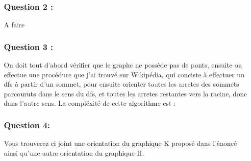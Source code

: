 \documentclass[]{article}
\begin{document}
\subsubsection{Question 2 :}\label{question-2-2}

A faire

\subsubsection{Question 3 :}\label{question-3-2}

On doit tout d'abord vérifier que le graphe ne possède pas de ponts,
ensuite on effectue une procédure que j'ai trouvé sur Wikipédia, qui
conciste à effectuer un dfs à partir d'un sommet, pour ensuite orienter
toutes les arretes des sommets parcouruts dans le sens du dfs, et toutes
les arretes restantes vers la racine, donc dans l'autre sens. La
compléxité de cette algorithme est :

\subsubsection{Question 4:}\label{question-4-1}

Vous trouverez ci joint une orientation du graphique K proposé dans
l'énoncé ainsi qu'une autre orientation du graphique H.
\end{document}
